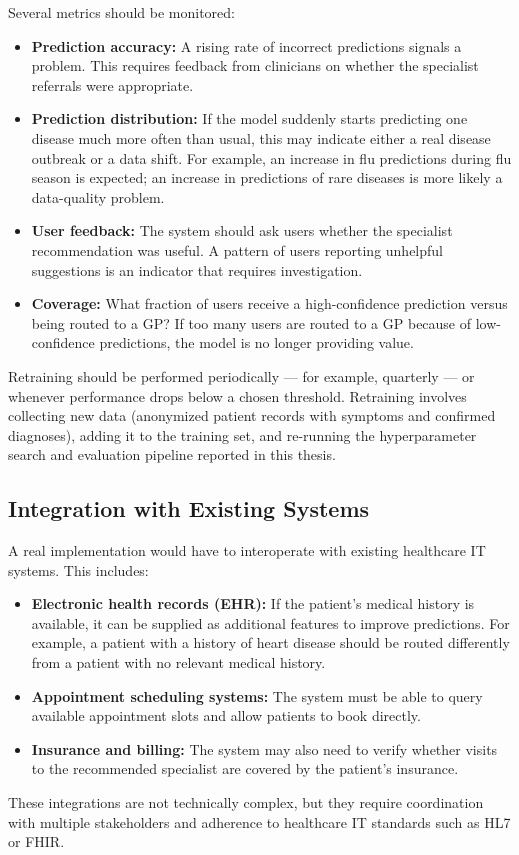 Several metrics should be monitored:

\begin{itemize}
    \item \textbf{Prediction accuracy:} A rising rate of incorrect predictions signals a problem. This requires feedback from clinicians on whether the specialist referrals were appropriate.
    \item \textbf{Prediction distribution:} If the model suddenly starts predicting one disease much more often than usual, this may indicate either a real disease outbreak or a data shift. For example, an increase in flu predictions during flu season is expected; an increase in predictions of rare diseases is more likely a data-quality problem.
    \item \textbf{User feedback:} The system should ask users whether the specialist recommendation was useful. A pattern of users reporting unhelpful suggestions is an indicator that requires investigation.
    \item \textbf{Coverage:} What fraction of users receive a high-confidence prediction versus being routed to a GP? If too many users are routed to a GP because of low-confidence predictions, the model is no longer providing value.
\end{itemize}

Retraining should be performed periodically --- for example, quarterly --- or whenever performance drops below a chosen threshold. Retraining involves collecting new data (anonymized patient records with symptoms and confirmed diagnoses), adding it to the training set, and re-running the hyperparameter search and evaluation pipeline reported in this thesis.

\subsection{Integration with Existing Systems}

A real implementation would have to interoperate with existing healthcare IT systems. This includes:

\begin{itemize}
    \item \textbf{Electronic health records (EHR):} If the patient's medical history is available, it can be supplied as additional features to improve predictions. For example, a patient with a history of heart disease should be routed differently from a patient with no relevant medical history.
    \item \textbf{Appointment scheduling systems:} The system must be able to query available appointment slots and allow patients to book directly.
    \item \textbf{Insurance and billing:} The system may also need to verify whether visits to the recommended specialist are covered by the patient's insurance.
\end{itemize}

These integrations are not technically complex, but they require coordination with multiple stakeholders and adherence to healthcare IT standards such as HL7 or FHIR.